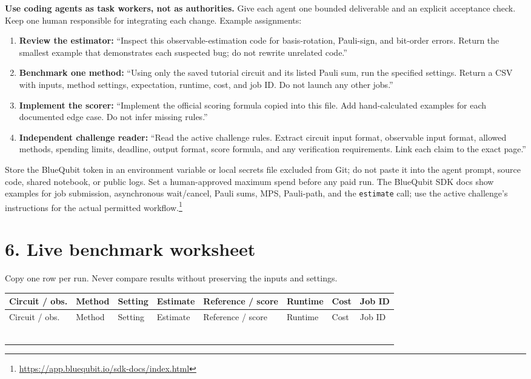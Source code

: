 \documentclass[11pt,letterpaper]{article}
\begin{document}
\textbf{Use coding agents as task workers, not as authorities.} Give each agent one bounded deliverable and an explicit acceptance check. Keep one human responsible for integrating each change. Example assignments:
\begin{enumerate}
  \item \textbf{Review the estimator:} ``Inspect this observable-estimation code for basis-rotation, Pauli-sign, and bit-order errors. Return the smallest example that demonstrates each suspected bug; do not rewrite unrelated code.''
  \item \textbf{Benchmark one method:} ``Using only the saved tutorial circuit and its listed Pauli sum, run the specified settings. Return a CSV with inputs, method settings, expectation, runtime, cost, and job ID. Do not launch any other jobs.''
  \item \textbf{Implement the scorer:} ``Implement the official scoring formula copied into this file. Add hand-calculated examples for each documented edge case. Do not infer missing rules.''
  \item \textbf{Independent challenge reader:} ``Read the active challenge rules. Extract circuit input format, observable input format, allowed methods, spending limits, deadline, output format, score formula, and any verification requirements. Link each claim to the exact page.''
\end{enumerate}

Store the BlueQubit token in an environment variable or local secrets file excluded from Git; do not paste it into the agent prompt, source code, shared notebook, or public logs. Set a human-approved maximum spend before any paid run. The BlueQubit SDK docs show examples for job submission, asynchronous wait/cancel, Pauli sums, MPS, Pauli-path, and the \texttt{estimate} call; use the active challenge's instructions for the actual permitted workflow.\footnote{\url{https://app.bluequbit.io/sdk-docs/index.html}}

\section*{6. Live benchmark worksheet}
Copy one row per run. Never compare results without preserving the inputs and settings.
\small
\begin{longtable}{@{}p{0.78in}p{0.62in}p{0.72in}p{0.77in}p{0.69in}p{0.68in}p{0.53in}p{0.58in}@{}}
\toprule
Circuit / obs. & Method & Setting & Estimate & Reference / score & Runtime & Cost & Job ID\\
\midrule
\endfirsthead
\toprule
Circuit / obs. & Method & Setting & Estimate & Reference / score & Runtime & Cost & Job ID\\
\midrule
\endhead
\rule{0pt}{0.55in} & & & & & & & \\
\rule{0pt}{0.55in} & & & & & & & \\
\rule{0pt}{0.55in} & & & & & & & \\
\rule{0pt}{0.55in} & & & & & & & \\
\rule{0pt}{0.55in} & & & & & & & \\
\rule{0pt}{0.55in} & & & & & & & \\
\bottomrule
\end{longtable}
\normalsize
\end{document}

